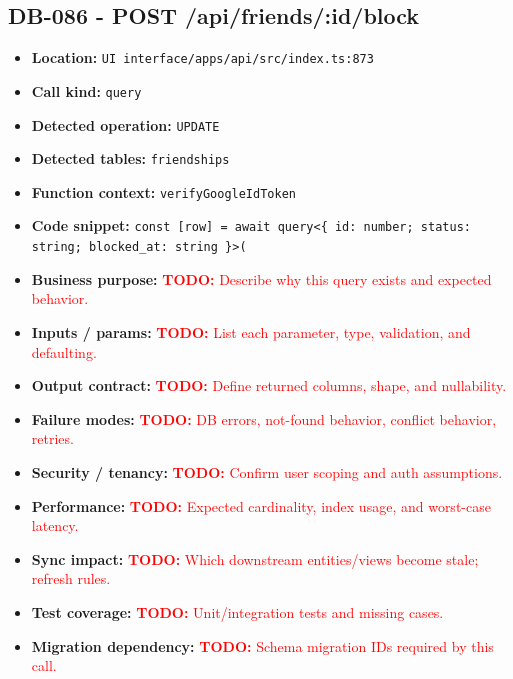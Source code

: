 \documentclass[11pt]{article}
\newcommand{\todoitem}[1]{\textcolor{red}{\textbf{TODO:} #1}}
\begin{document}
\subsection{DB-086 - POST /api/friends/:id/block}
\begin{itemize}[leftmargin=1.5em]
\item \textbf{Location:} \texttt{UI interface/apps/api/src/index.ts:873}
\item \textbf{Call kind:} \texttt{query}
\item \textbf{Detected operation:} \texttt{UPDATE}
\item \textbf{Detected tables:} \texttt{friendships}
\item \textbf{Function context:} \texttt{verifyGoogleIdToken}
\item \textbf{Code snippet:} \texttt{const [row] = await query<\{ id: number; status: string; blocked\_at: string \}>(}
\item \textbf{Business purpose:} \todoitem{Describe why this query exists and expected behavior.}
\item \textbf{Inputs / params:} \todoitem{List each parameter, type, validation, and defaulting.}
\item \textbf{Output contract:} \todoitem{Define returned columns, shape, and nullability.}
\item \textbf{Failure modes:} \todoitem{DB errors, not-found behavior, conflict behavior, retries.}
\item \textbf{Security / tenancy:} \todoitem{Confirm user scoping and auth assumptions.}
\item \textbf{Performance:} \todoitem{Expected cardinality, index usage, and worst-case latency.}
\item \textbf{Sync impact:} \todoitem{Which downstream entities/views become stale; refresh rules.}
\item \textbf{Test coverage:} \todoitem{Unit/integration tests and missing cases.}
\item \textbf{Migration dependency:} \todoitem{Schema migration IDs required by this call.}
\end{itemize}
\end{document}
